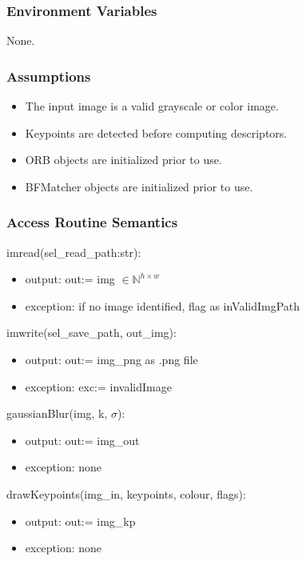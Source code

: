 \documentclass[12pt, titlepage]{article}
\begin{document}
\subsubsection{Environment Variables}
None.

\subsubsection{Assumptions}
\begin{itemize}
    \item The input image is a valid grayscale or color image.
    \item Keypoints are detected before computing descriptors.
    \item ORB objects are initialized prior to use.
    \item BFMatcher objects are initialized prior to use.
\end{itemize}

\subsubsection{Access Routine Semantics}

\noindent imread(sel\_read\_path:str):
\begin{itemize}
\item output: out:= img $\in \mathbb{N}^{h \times w}$
\item exception: if no image identified, flag as inValidImgPath 
\end{itemize}

\noindent imwrite(sel\_save\_path, out\_img):
\begin{itemize}
\item output: out:= img\_png as .png file
\item exception: exc:= invalidImage
\end{itemize}

\noindent gaussianBlur(img, k, $\sigma$):
\begin{itemize}
    \item output: out:= img\_out
    \item exception: none
\end{itemize}

\noindent drawKeypoints(img\_in, keypoints, colour, flags):
\begin{itemize}
\item output: out:= img\_kp 
\item exception: none
\end{itemize}
\end{document}
